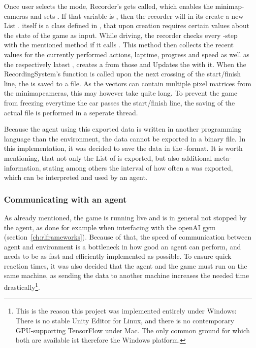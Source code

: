 Once user selects the  mode, Recorder's  gets called, which enables the minimap-cameras and sets . If that variable is , then the recorder will in its  create a new List .  itself is a class defined in , that upon creation requires certain values about the state of the game as input. While driving, the recorder checks every -step with the mentioned method if it calls . This method then collects the recent values for the currently performed actions, laptime, progress and speed as well as the respectively latest , creates a  from those and Updates the  with it. When the RecordingSystem's  function is called upon the next crossing of the start/finish line, the  is saved to a file. As the vectors can contain multiple pixel matrices from the minimapcameras, this may however take quite long. To prevent the game from freezing everytime the car passes the start/finish line, the saving of the actual file is performed in a seperate thread.

Because the agent using this exported data is written in another programming language than the environment, the data cannot be exported in a binary file. In this implementation, it was decided to save the data in the -format. It is worth mentioning, that not only the List of  is exported, but also additional meta-information, stating among others the interval of how often a  was exported, which can be interpreted and used by an agent.

\subsubsection{Communicating with an agent}

As already mentioned, the game is running live and is in general not stopped by the agent, as done for example when interfacing with the openAI gym (section~\ref{ch:rlframeworks}). Because of that, the speed of communication between agent and environment is a bottleneck in how good an agent can perform, and needs to be as fast and efficiently implemented as possible. To ensure quick reaction times, it was also decided that the agent and the game must run on the same machine, as sending the data to another machine increases the needed time drastically\footnote{This is the reason this project was implemented entirely under Windows: There is no stable Unity Editor for Linux, and there is no contemporary GPU-supporting TensorFlow under Mac. The only common ground for which both are available ist therefore the Windows platform.}.

